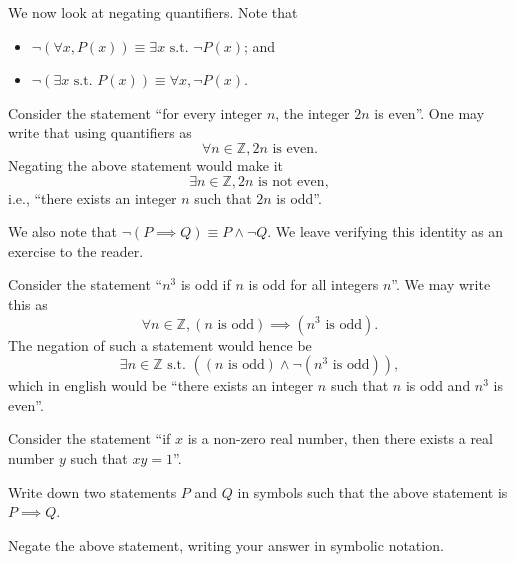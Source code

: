 We now look at negating quantifiers. Note that
\begin{itemize}
    \item $\lnot(\forall x, P(x)) \equiv \exists x \text{ s.t. } \lnot P(x)$; and
    \item $\lnot(\exists x \text{ s.t. } P(x)) \equiv \forall x, \lnot P(x)$.
\end{itemize}
\begin{example}
    Consider the statement ``for every integer $n$, the integer $2n$ is even''. One may write that using quantifiers as
    \[
        \forall n \in\mathbb{Z}, 2n \text{ is even}.
    \]
    Negating the above statement would make it
    \[
        \exists n \in \mathbb{Z}, 2n \text{ is not even},
    \]
    i.e., ``there exists an integer $n$ such that $2n$ is odd''.
\end{example}

We also note that $\lnot(P \implies Q) \equiv P \land \lnot Q$. We leave verifying this identity as an exercise to the reader.

\begin{example}
    Consider the statement ``$n^3$ is odd if $n$ is odd for all integers $n$''. We may write this as
    \[
        \forall n \in \mathbb{Z}, (n \text{ is odd}) \implies (n^3 \text{ is odd}).
    \]
    The negation of such a statement would hence be
    \[
        \exists n \in \mathbb{Z} \text{ s.t. }((n \text{ is odd}) \land \lnot(n^3 \text{ is odd})),
    \]
    which in english would be ``there exists an integer $n$ such that $n$ is odd and $n^3$ is even''.
\end{example}

\begin{exercise}
    Consider the statement ``if $x$ is a non-zero real number, then there exists a real number $y$ such that $xy = 1$''.
    \begin{partquestions}{\roman*}
        \item Write down two statements $P$ and $Q$ in symbols such that the above statement is $P \implies Q$.
        \item Negate the above statement, writing your answer in symbolic notation.
    \end{partquestions}
\end{exercise}

